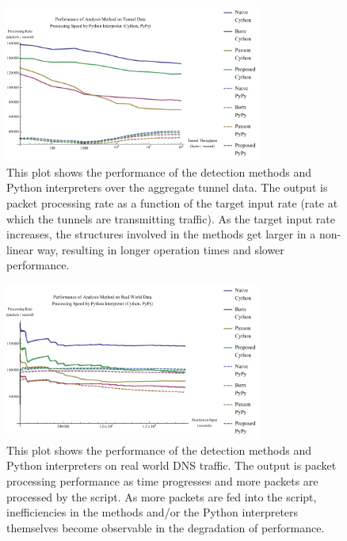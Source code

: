\documentclass{llncs}
\begin{document}
\begin{figure}
\centering
\includegraphics[width=0.75\textwidth]{../figures/pmat.pdf}
\caption[Performance of Analysis Method and Python Interpreter on Aggregate
Tunnel Data]{This plot shows the performance of the detection methods and Python
interpreters over the aggregate tunnel data. The output is packet processing
rate as a function of the target input rate (rate at which the tunnels are
transmitting traffic). As the target input rate increases, the structures
involved in the methods get larger in a non-linear way, resulting in longer
operation times and slower performance.}
\label{pmat}
\end{figure}



\begin{figure}
\centering
\includegraphics[width=0.75\textwidth]{../figures/pmqr.pdf}
\caption[Performance of Analysis Method and Python Interpreter on Real World
Data]{This plot shows the performance of the detection methods and Python
interpreters on real world DNS traffic. The output is packet processing performance as time
progresses and more packets are processed by the script. As more packets are fed
into the script, inefficiencies in the methods and/or the Python interpreters
themselves become observable in the degradation of performance.}
\label{pmqr}
\end{figure}
\end{document}
